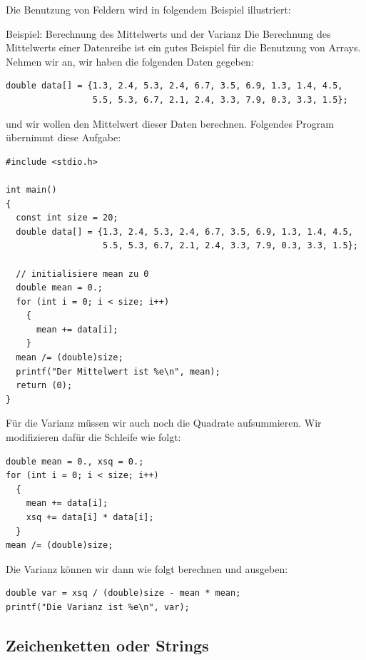 Die Benutzung von Feldern wird in folgendem Beispiel illustriert:
\begin{myexampleprogram}{Beispiel: Berechnung des Mittelwerts und der Varianz}
  Die Berechnung des Mittelwerts einer Datenreihe ist ein gutes Beispiel für die Benutzung von Arrays.
  Nehmen wir an, wir haben die folgenden Daten gegeben:
\begin{lstlisting}
double data[] = {1.3, 2.4, 5.3, 2.4, 6.7, 3.5, 6.9, 1.3, 1.4, 4.5,
                 5.5, 5.3, 6.7, 2.1, 2.4, 3.3, 7.9, 0.3, 3.3, 1.5};
\end{lstlisting}
  und wir wollen den Mittelwert dieser Daten berechnen.
  Folgendes Program übernimmt diese Aufgabe:
\begin{lstlisting}
#include <stdio.h>

int main()
{
  const int size = 20;
  double data[] = {1.3, 2.4, 5.3, 2.4, 6.7, 3.5, 6.9, 1.3, 1.4, 4.5,
                   5.5, 5.3, 6.7, 2.1, 2.4, 3.3, 7.9, 0.3, 3.3, 1.5};

  // initialisiere mean zu 0
  double mean = 0.;
  for (int i = 0; i < size; i++)
    {
      mean += data[i];
    }
  mean /= (double)size;
  printf("Der Mittelwert ist %e\n", mean);
  return (0);
}
\end{lstlisting}
  Für die Varianz müssen wir auch noch die Quadrate aufsummieren.
  Wir modifizieren dafür die Schleife wie folgt:
\begin{lstlisting}
double mean = 0., xsq = 0.;
for (int i = 0; i < size; i++)
  {
    mean += data[i];
    xsq += data[i] * data[i];
  }
mean /= (double)size;
\end{lstlisting}
  Die Varianz können wir dann wie folgt berechnen und ausgeben:
\begin{lstlisting}
double var = xsq / (double)size - mean * mean;
printf("Die Varianz ist %e\n", var);
\end{lstlisting}
\end{myexampleprogram}

\subsection{Zeichenketten oder Strings}


